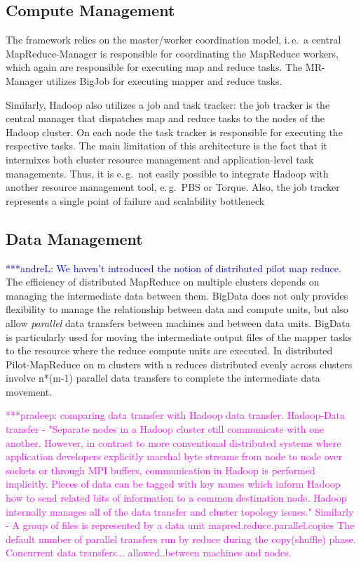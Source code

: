 \documentclass{acm_proc_article-sp}
\newcommand{\alnote}[1]{ {\textcolor{blue} { ***andreL: #1 }}}
\newcommand{\pnote}[1]{ {\textcolor{magenta} { ***pradeep: #1 }}}
\newcommand{\alnote}[1]{}
\newcommand{\pnote}[1]{}
\newcommand{\pilotmapreduce}{Pilot-MapReduce\xspace}
\begin{document}
\subsection{Compute Management}
The framework relies on the master/worker
coordination model, i.\,e.\ a central MapReduce-Manager is responsible for
coordinating the MapReduce workers, which again are responsible for executing
map and reduce tasks. The MR-Manager utilizes BigJob for executing
mapper and reduce tasks. 

Similarly, Hadoop also utilizes a job and task tracker: the job tracker is the
central manager that dispatches map and reduce tasks to the nodes of the
Hadoop cluster. On each node the task tracker is responsible for executing the
respective tasks. The main limitation of this architecture is the fact that it
intermixes both cluster resource management and application-level task
managements. Thus, it is e.\,g.\ not easily possible to integrate Hadoop with
another resource management tool, e.\,g.\ PBS or Torque. Also, the job tracker
represents a single point of failure and scalability bottleneck

\subsection{Data Management}
\alnote{We haven't introduced the notion of distributed pilot map reduce.}
The efficiency of distributed MapReduce on multiple clusters depends on managing the
intermediate data between them. BigData does not only provides flexibility to manage the
relationship between data and compute units, but also allow {\it parallel} data transfers
between machines and between data units. BigData is particularly used for moving the
intermediate output files of the mapper tasks to the resource where the reduce compute
units are executed. In distributed \pilotmapreduce on m clusters with n reduces distributed
evenly across clusters involve n*(m-1) parallel data transfers to complete the intermediate
data movement.


\pnote{
   comparing data transfer with Hadoop data transfer.
Hadoop-Data transfer - "Separate nodes in a Hadoop cluster still communicate with one another. However, in contrast to more conventional distributed systems where application developers explicitly marshal byte streams from node to node over sockets or through MPI buffers, communication in Hadoop is performed implicitly. Pieces of data can be tagged with key names which inform Hadoop how to send related bits of information to a common destination node. Hadoop internally manages all of the data transfer and cluster topology issues."
Similarly - A group of files is represented by a data unit
mapred.reduce.parallel.copies		The default number of parallel transfers run by reduce during the copy(shuffle) phase.
Concurrent data transfers... allowed..between machines and nodes.}
\end{document}
